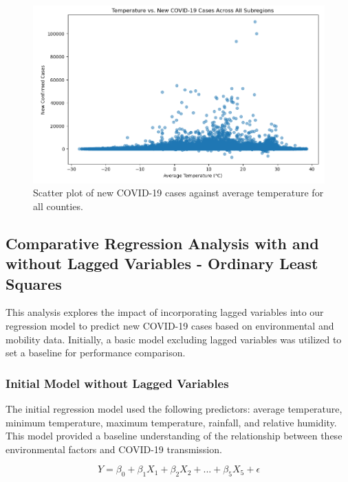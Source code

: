 \documentclass[sigconf,screen,nonacm]{acmart}
\begin{document}
\begin{figure}[H]
  \centering
  \includegraphics[width=\linewidth]{Figures/Correlation-scatter.PNG}
  \caption{Scatter plot of new COVID-19 cases against average temperature for all counties.}
  \label{fig:scatter-cor}
\end{figure}

\noindent
\subsection{Comparative Regression Analysis with and without Lagged Variables - Ordinary Least Squares} \label{Sec:ComparativeRegr}

This analysis explores the impact of incorporating lagged variables into our regression model to predict new COVID-19 cases based on environmental and mobility data. Initially, a basic model excluding lagged variables was utilized to set a baseline for performance comparison.

\subsubsection{Initial Model without Lagged Variables}
The initial regression model used the following predictors: average temperature, minimum temperature, maximum temperature, rainfall, and relative humidity. This model provided a baseline understanding of the relationship between these environmental factors and COVID-19 transmission.

\begin{equation}
Y = \beta_0 + \beta_1X_1 + \beta_2X_2 + ... + \beta_5X_5 + \epsilon
\end{equation}
\end{document}
